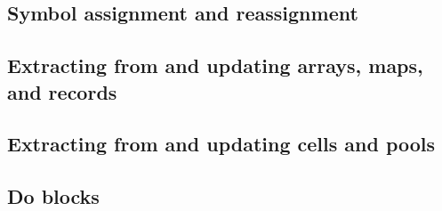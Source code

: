\documentclass{article}
\theoremstyle{definition}
\begin{document}
\hypertarget{hsec:let-set}{}
\subsection{Symbol assignment and reassignment}
\label{sec:let-set}


\hypertarget{hsec:attr-form}{}
\subsection{Extracting from and updating arrays, maps, and records}
\label{sec:attr-form}



\hypertarget{hsec:cell-pool-forms}{}
\subsection{Extracting from and updating cells and pools}
\label{sec:cell-pool-forms}



\hypertarget{hsec:doblocks}{}
\subsection{Do blocks}
\label{sec:doblocks}

\end{document}
